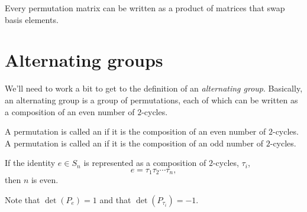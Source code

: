 \documentclass{ximera}
\begin{document}
\begin{corollary}
  Every permutation matrix can be written as a product of matrices
  that swap basis elements. 
\end{corollary}




\section{Alternating groups}


We'll need to work a bit to get to the definition of an
\textit{alternating group}. Basically, an alternating group is a group
of permutations, each of which can be written as a composition of an
even number of $2$-cycles.




\begin{definition}
  A permutation is called an  if it is the
  composition of an even number of $2$-cycles. A permutation is called
  an  if it is the composition of an odd number
  of $2$-cycles.
\end{definition}










\begin{lemma}
  If the identity $e\in S_n$ is represented as a composition of $2$-cycles, $\tau_i$, 
  \[
  e = \tau_1 \tau_2 \cdots \tau_n,
  \]
  then $n$ is even.
  \begin{sketch}
    Note that $\det(P_{e})=1$ and that $\det(P_{\tau_i})=-1$.
  \end{sketch}
\end{lemma}
\end{document}
